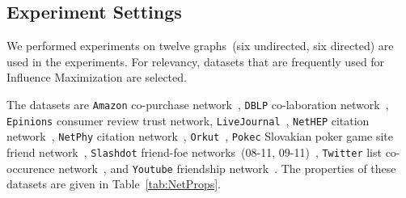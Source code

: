 \documentclass[10pt,journal,compsoc]{IEEEtran}
\begin{document}
\begin{table}[!ht]
\caption{Properties of networks used in the experiments}\label{tab:NetProps}
\centering
{}
\end{table}
\subsection{Experiment Settings}

We performed experiments on twelve graphs~(six undirected, six directed) are used in the experiments. For relevancy, datasets that are frequently used for Influence Maximization are selected.

The datasets are {\tt Amazon} co-purchase network~\cite{snapnets}, {\tt DBLP} co-laboration network~\cite{snapnets}, {\tt Epinions} consumer review trust network, {\tt LiveJournal}~\cite{snapnets}, {\tt NetHEP} citation network~\cite{MixGreedy}, {\tt NetPhy} citation network~\cite{MixGreedy}, {\tt Orkut}~\cite{snapnets}, {\tt Pokec} Slovakian poker game site friend network~\cite{snapnets}, {\tt Slashdot} friend-foe networks~(08-11, 09-11)~\cite{snapnets}, {\tt Twitter} list co-occurence network~\cite{snapnets}, and {\tt Youtube} friendship network~\cite{snapnets}. The properties of these datasets are given in Table~\ref{tab:NetProps}. 
\end{document}
